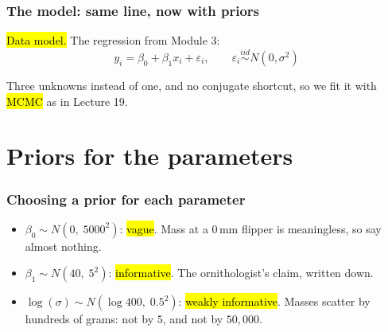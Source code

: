 \documentclass[slidestop,compress,mathserif]{beamer}
\begin{document}
\begin{frame}
\frametitle{The model: same line, now with priors}

\hl{Data model.} The regression from Module 3:
\[
y_i = \beta_0 + \beta_1 x_i + \varepsilon_i, \qquad \varepsilon_i \stackrel{iid}{\sim} N(0, \sigma^2)
\]
\pause
\medskip


\pause
\medskip

Three unknowns instead of one, and no conjugate shortcut, so we fit it with \hl{MCMC} as in Lecture 19.
\end{frame}

\section{Priors for the parameters}

\begin{frame}
\frametitle{Choosing a prior for each parameter}


\pause
\medskip

\begin{itemize}
    \item $\beta_0 \sim N(0,\; 5000^2)$: \hl{vague}. Mass at a $0$\,mm flipper is meaningless, so say almost nothing.
    \pause
    \item $\beta_1 \sim N(40,\; 5^2)$: \hl{informative}. The ornithologist's claim, written down.
    \pause
    \item $\log(\sigma) \sim N(\log 400,\; 0.5^2)$: \hl{weakly informative}. Masses scatter by hundreds of grams: not by $5$, and not by $50{,}000$.
\end{itemize}
\end{frame}
\end{document}
